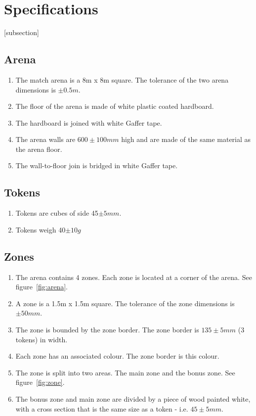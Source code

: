 \section{Specifications}
[subsection]
\newcommand{\rcnii}{\stepcounter{rulei}\arabic{section}.\arabic{subsection}.\arabic{rulei}}
\renewcommand{\labelenumi}{\rcnii}

\subsection{Arena}
\begin{enumerate}
\item The match arena is a 8m x 8m square.  The tolerance of the two arena dimensions is $\pm0.5m$.
\item The floor of the arena is made of white plastic coated hardboard.
\item The hardboard is joined with white Gaffer tape.
\item The arena walls are $600\pm100mm$ high and are made of the same material as the arena floor.
\item The wall-to-floor join is bridged in white Gaffer tape.
\end{enumerate}

\subsection{Tokens}
\label{tokens}

\begin {enumerate} 
\item Tokens are cubes of side 45$\pm5mm$.
\item Tokens weigh 40$\pm10g$
\end {enumerate}

\subsection{Zones}
\begin {enumerate}
\item The arena contains 4 zones.  Each zone is located at a corner of the arena.  See figure~\ref{fig:arena}.
\item A zone is a 1.5m x 1.5m square.  The tolerance of the zone dimensions is $\pm50mm$.
\item The zone is bounded by the zone border.  The zone border is $135\pm5mm$ (3 tokens) in width.
\item Each zone has an associated colour.  The zone border is this colour.
\item The zone is split into two areas.  The main zone and the bonus zone.  See figure~\ref{fig:zone}.
\item The bonus zone and main zone are divided by a piece of wood painted white, with a cross section that is the same size as a token - i.e. $45\pm5mm$.
\end {enumerate}

